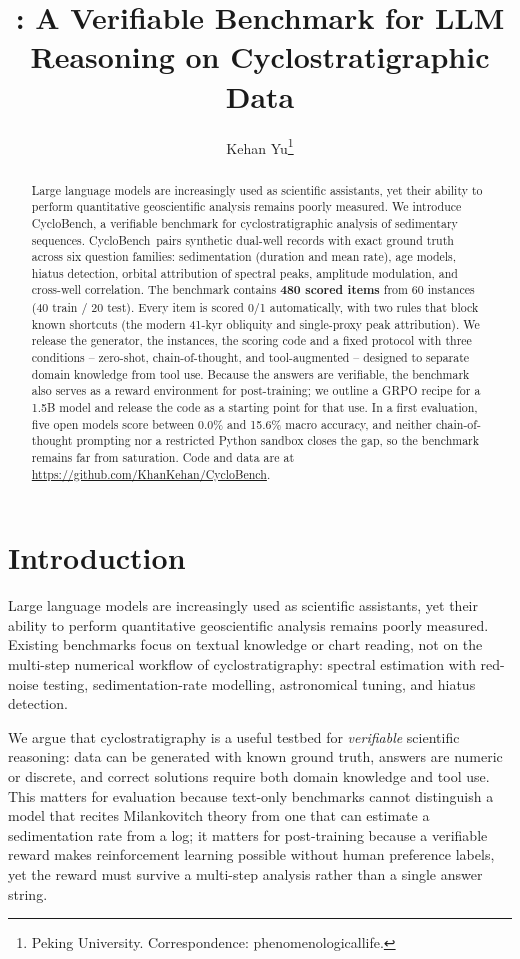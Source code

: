 \documentclass[10pt]{article}
\title{\method: A Verifiable Benchmark for LLM Reasoning on Cyclostratigraphic Data}
\author{Kehan Yu\thanks{Peking University. Correspondence: phenomenologicallife.}}
\date{}
\newcommand{\method}{CycloBench}
\begin{document}
\maketitle

\begin{abstract}
Large language models are increasingly used as scientific assistants, yet their ability to
perform quantitative geoscientific analysis remains poorly measured. We introduce \method, a
verifiable benchmark for cyclostratigraphic analysis of sedimentary sequences. \method\ pairs
synthetic dual-well records with exact ground truth across six question families: sedimentation
(duration and mean rate), age models, hiatus detection, orbital attribution of spectral peaks,
amplitude modulation, and cross-well correlation. The benchmark contains \textbf{480 scored
items} from 60 instances (40 train / 20 test). Every item is scored 0/1 automatically, with two
rules that block known shortcuts (the modern 41-kyr obliquity and single-proxy peak
attribution). We release the generator, the instances, the scoring code and a fixed protocol
with three conditions -- zero-shot, chain-of-thought, and tool-augmented -- designed to
separate domain knowledge from tool use. Because the answers are verifiable, the benchmark also
serves as a reward environment for post-training; we outline a GRPO recipe for a 1.5B model and
release the code as a starting point for that use. In a first evaluation, five open models score
between 0.0\% and 15.6\% macro accuracy, and neither chain-of-thought prompting nor a
restricted Python sandbox closes the gap, so the benchmark remains far from saturation.
Code and data are at
\url{https://github.com/KhanKehan/CycloBench}.
\end{abstract}

\section{Introduction}
\label{sec:intro}
Large language models are increasingly used as scientific assistants, yet their ability to
perform quantitative geoscientific analysis remains poorly measured. Existing benchmarks focus
on textual knowledge or chart reading, not on the multi-step numerical workflow of
cyclostratigraphy: spectral estimation with red-noise testing, sedimentation-rate modelling,
astronomical tuning, and hiatus detection.

We argue that cyclostratigraphy is a useful testbed for \emph{verifiable} scientific reasoning:
data can be generated with known ground truth, answers are numeric or discrete, and correct
solutions require both domain knowledge and tool use. This matters for evaluation because
text-only benchmarks cannot distinguish a model that recites Milankovitch theory from one that
can estimate a sedimentation rate from a log; it matters for post-training because a verifiable
reward makes reinforcement learning possible without human preference labels, yet the reward
must survive a multi-step analysis rather than a single answer string.
\end{document}
